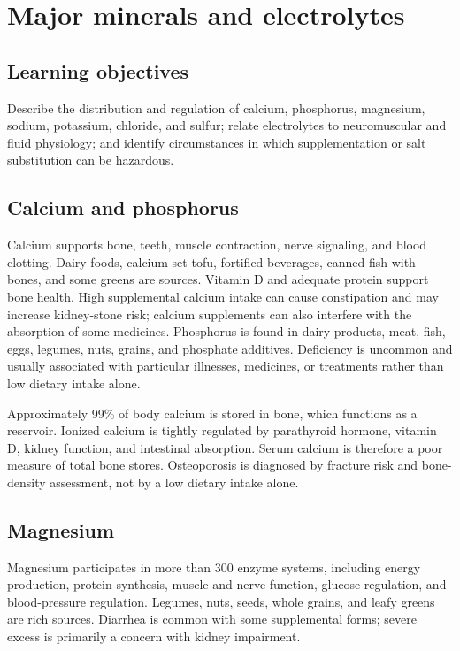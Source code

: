 \chapter{Major minerals and electrolytes}

\section{Learning objectives}
Describe the distribution and regulation of calcium, phosphorus, magnesium, sodium, potassium, chloride, and sulfur; relate electrolytes to neuromuscular and fluid physiology; and identify circumstances in which supplementation or salt substitution can be hazardous.

\section{Calcium and phosphorus}
Calcium supports bone, teeth, muscle contraction, nerve signaling, and blood clotting. Dairy foods, calcium-set tofu, fortified beverages, canned fish with bones, and some greens are sources. Vitamin D and adequate protein support bone health. High supplemental calcium intake can cause constipation and may increase kidney-stone risk; calcium supplements can also interfere with the absorption of some medicines. Phosphorus is found in dairy products, meat, fish, eggs, legumes, nuts, grains, and phosphate additives. Deficiency is uncommon and usually associated with particular illnesses, medicines, or treatments rather than low dietary intake alone. \cite{odsCa,odsPhos}

Approximately 99\% of body calcium is stored in bone, which functions as a reservoir. Ionized calcium is tightly regulated by parathyroid hormone, vitamin D, kidney function, and intestinal absorption. Serum calcium is therefore a poor measure of total bone stores. Osteoporosis is diagnosed by fracture risk and bone-density assessment, not by a low dietary intake alone. \cite{odsCa}

\section{Magnesium}
Magnesium participates in more than 300 enzyme systems, including energy production, protein synthesis, muscle and nerve function, glucose regulation, and blood-pressure regulation. Legumes, nuts, seeds, whole grains, and leafy greens are rich sources. Diarrhea is common with some supplemental forms; severe excess is primarily a concern with kidney impairment. \cite{odsMg}

